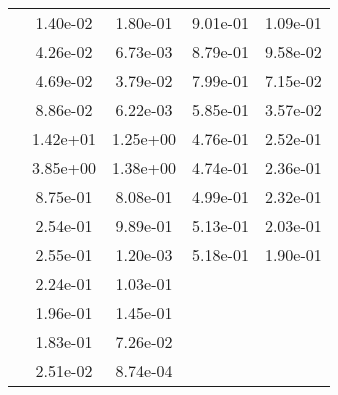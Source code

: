 \begin{table}
\begin{tabular}{c|cc|cc|}
\multicolumn{1}{|c|}{} & \multicolumn{1}{|c|}{  1.40e-02} & \multicolumn{1}{|c|}{  1.80e-01} & \multicolumn{1}{|c|}{  9.01e-01} & \multicolumn{1}{|c|}{  1.09e-01} \\ 
\multicolumn{1}{|c|}{} & \multicolumn{1}{|c|}{  4.26e-02} & \multicolumn{1}{|c|}{  6.73e-03} & \multicolumn{1}{|c|}{  8.79e-01} & \multicolumn{1}{|c|}{  9.58e-02} \\ 
\multicolumn{1}{|c|}{} & \multicolumn{1}{|c|}{  4.69e-02} & \multicolumn{1}{|c|}{  3.79e-02} & \multicolumn{1}{|c|}{  7.99e-01} & \multicolumn{1}{|c|}{  7.15e-02} \\ 
\multicolumn{1}{|c|}{} & \multicolumn{1}{|c|}{  8.86e-02} & \multicolumn{1}{|c|}{  6.22e-03} & \multicolumn{1}{|c|}{  5.85e-01} & \multicolumn{1}{|c|}{  3.57e-02} \\ 
\multicolumn{1}{|c|}{} & \multicolumn{1}{|c|}{  1.42e+01} & \multicolumn{1}{|c|}{  1.25e+00} & \multicolumn{1}{|c|}{  4.76e-01} & \multicolumn{1}{|c|}{  2.52e-01} \\ 
\multicolumn{1}{|c|}{} & \multicolumn{1}{|c|}{  3.85e+00} & \multicolumn{1}{|c|}{  1.38e+00} & \multicolumn{1}{|c|}{  4.74e-01} & \multicolumn{1}{|c|}{  2.36e-01} \\ 
\multicolumn{1}{|c|}{} & \multicolumn{1}{|c|}{  8.75e-01} & \multicolumn{1}{|c|}{  8.08e-01} & \multicolumn{1}{|c|}{  4.99e-01} & \multicolumn{1}{|c|}{  2.32e-01} \\ 
\multicolumn{1}{|c|}{} & \multicolumn{1}{|c|}{  2.54e-01} & \multicolumn{1}{|c|}{  9.89e-01} & \multicolumn{1}{|c|}{  5.13e-01} & \multicolumn{1}{|c|}{  2.03e-01} \\ 
\multicolumn{1}{|c|}{} & \multicolumn{1}{|c|}{  2.55e-01} & \multicolumn{1}{|c|}{  1.20e-03} & \multicolumn{1}{|c|}{  5.18e-01} & \multicolumn{1}{|c|}{  1.90e-01} \\ 
\multicolumn{1}{|c|}{} & \multicolumn{1}{|c|}{  2.24e-01} & \multicolumn{1}{|c|}{  1.03e-01} & \multicolumn{1}{|c|}{} & \multicolumn{1}{|c|}{} \\ 
\multicolumn{1}{|c|}{} & \multicolumn{1}{|c|}{  1.96e-01} & \multicolumn{1}{|c|}{  1.45e-01} & \multicolumn{1}{|c|}{} & \multicolumn{1}{|c|}{} \\ 
\multicolumn{1}{|c|}{} & \multicolumn{1}{|c|}{  1.83e-01} & \multicolumn{1}{|c|}{  7.26e-02} & \multicolumn{1}{|c|}{} & \multicolumn{1}{|c|}{} \\ 
\multicolumn{1}{|c|}{} & \multicolumn{1}{|c|}{  2.51e-02} & \multicolumn{1}{|c|}{  8.74e-04} & \multicolumn{1}{|c|}{} & \multicolumn{1}{|c|}{} \\ 

\end{tabular}
\end{table}
